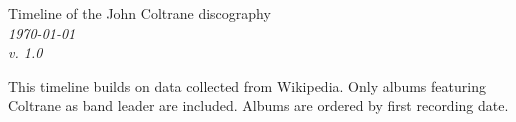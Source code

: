 \documentclass[a4paper, landscape]{article}
\newcounter{timelineend}
\newlength\legendx
\newcommand\makethelegend{
\small
    \node at (\legendx, 4.3) 
        [legend, anchor=north] (recorddatelegend) 
        {First recording date} ;

    \node at (\legendx, 4.5) 
        [legend, anchor=south, color=gray] 
        {Release year\\(if other than first rec.)};

    \node at (\legendx, 3.65) [legend] {*\,=\,live};

        \def\nodecolor{black}

    \node at (\legendx, 3.1) [] {Album};

    \node at (\legendx, 2.8) [inner sep=1.5pt, legend, anchor=north] (albumlegend) {Record label} ;

    \foreach \l/\c in 
        {Prestige/red,
        Blue~Note/blue,
        Savoy/violet,
        Atlantic/green,
        Pablo/black,
        Impulse!/orange}
        {
            \node at (albumlegend.south) 
                [inner sep=1.5pt, legend, rounded corners, draw=\c!40, fill=\c!10, anchor=north]
                (albumlegend) {\l\vphantom{jk}};
        }

        \node at (\legendx, -1.5) 
            []
            {Personnel};

        \node at (\legendx,-4)
            [legend]
            {Other\\recording\\dates};
}
\begin{document}
\thispagestyle{empty}

\begin{minipage}[t]{.4\textwidth}
{\huge Timeline of the John Coltrane discography}\\[\medskipamount]
\textit{\today\\v. 1.0}
\end{minipage}
\hfill
\begin{minipage}[t]{.38\textwidth}
\large
This timeline builds on data collected from Wikipedia. Only albums featuring Coltrane as band leader are included. Albums are ordered by first recording date.
\end{minipage}


\vfill

\center


\end{document}
